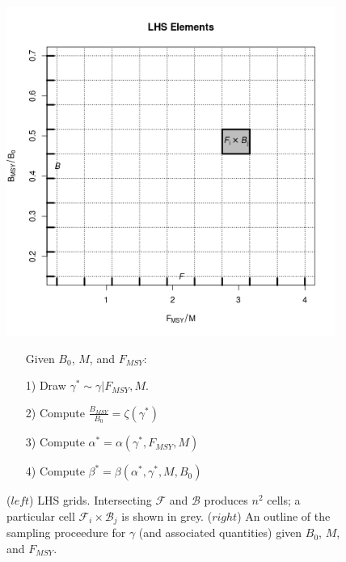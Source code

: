 \documentclass[12pt]{article}
\begin{document}
%
\begin{figure}[h!]
\centering
\begin{minipage}[h!]{0.49\textwidth}
	\includegraphics[width=0.96\textwidth]{../gpBias/designGrid.png}
\end{minipage}
\begin{minipage}[h!]{0.49\textwidth}
\begin{itemize}
	\item[] \hspace*{-1cm}Given $B_0$, $M$, and $F_{MSY}$:
	\item[1)] Draw $\gamma^* \sim \gamma|F_{MSY}, M$.
	\item[2)] Compute $\frac{B_{MSY}}{B_0} = \zeta(\gamma^*)$
	\item[3)] Compute $\alpha^* = \alpha(\gamma^*, F_{MSY}, M)$
        \item[4)] Compute $\beta^* = \beta(\alpha^*, \gamma^*, M, B_0)$
\end{itemize}
\end{minipage}
\caption{
($left$) LHS grids. Intersecting $\mathcal{F}$ and $\mathcal{B}$ produces $n^2$ 
cells; a particular cell $\mathcal{F}_i\times\mathcal{B}_j$ is shown in grey. 
($right$) An outline of the sampling proceedure for $\gamma$ (and associated 
quantities) given $B_0$, $M$, and $F_{MSY}$. %
\label{sudoGrid}}
\end{figure}
\end{document}
